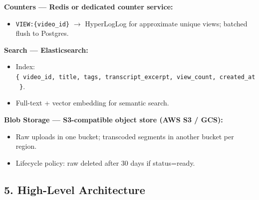 \documentclass[11pt]{article}
\providecommand{\tightlist}{\setlength{\itemsep}{1pt}\setlength{\parskip}{0pt}}
\begin{document}
\textbf{Counters --- Redis or dedicated counter service:}

\begin{itemize}
\tightlist
\item
  \texttt{VIEW:\{video\_id\}} \(\rightarrow\) HyperLogLog for approximate unique views; batched flush to Postgres.
\end{itemize}

\textbf{Search --- Elasticsearch:}

\begin{itemize}
\tightlist
\item
  Index: \texttt{\{\ video\_id,\ title,\ tags,\ transcript\_excerpt,\ view\_count,\ created\_at\ \}}.
\item
  Full-text + vector embedding for semantic search.
\end{itemize}

\textbf{Blob Storage --- S3-compatible object store (AWS S3 / GCS):}

\begin{itemize}
\tightlist
\item
  Raw uploads in one bucket; transcoded segments in another bucket per region.
\item
  Lifecycle policy: raw deleted after 30 days if status=ready.
\end{itemize}

\subsection{5. High-Level Architecture}\label{5-high-level-architecture}

\setcodelang{}
\end{document}
